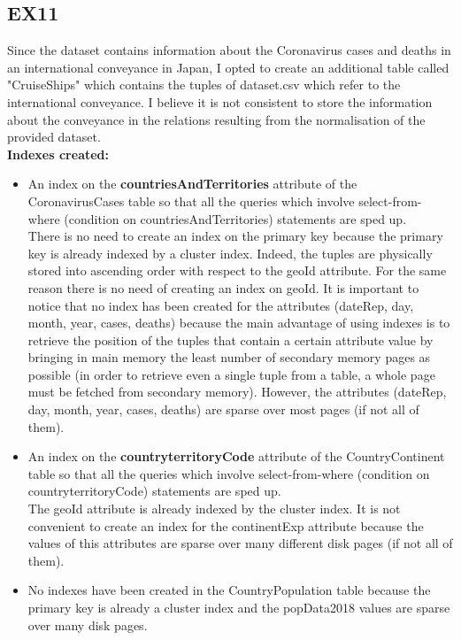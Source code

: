 \documentclass{article}
\begin{document}
\subsection{EX11}
Since the dataset contains information about the Coronavirus cases and deaths in an international conveyance in Japan, I opted to create an additional table called "CruiseShips" which contains the tuples of dataset.csv which refer to the international conveyance. I believe it is not consistent to store the information about the conveyance in the relations resulting from the normalisation of the provided dataset.\\
\textbf{Indexes created:}
\begin{itemize}
    \item An index on the \textbf{countriesAndTerritories} attribute of the CoronavirusCases table so that all the queries which involve select-from-where (condition on countriesAndTerritories) statements are sped up.\\
    There is no need to create an index on the primary key because the primary key is already indexed by
a cluster index. Indeed, the tuples are physically stored into ascending order with respect to the geoId
attribute. For the same reason there is no need of creating an index on geoId. It is important to notice
that no index has been created for the attributes (dateRep, day, month, year, cases, deaths) because the main advantage
of using indexes is to retrieve the position of the tuples that contain a certain attribute value by bringing
in main memory the least number of secondary memory pages as possible (in order to retrieve even a
single tuple from a table, a whole page must be fetched from secondary memory). However, the attributes
(dateRep, day, month, year, cases, deaths) are sparse over most pages (if not all of them).

\item An index on the \textbf{countryterritoryCode} attribute of the CountryContinent table so that all the queries which involve select-from-where (condition on countryterritoryCode) statements are sped up.\\
The geoId attribute is already indexed by the cluster index. It is not convenient to create an index for
the continentExp attribute because the values of this attributes are sparse over many different disk pages
(if not all of them).
\item  No indexes have been created in the CountryPopulation table because the primary key is already a cluster index and the popData2018 values are sparse over many
disk pages.
\end{itemize}
\end{document}
